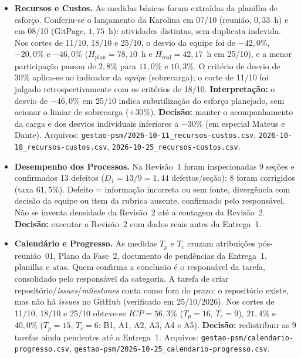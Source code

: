 \begin{itemize}
    \item \textbf{Recursos e Custos.}
    As medidas básicas foram extraídas da planilha de esforço. Conferiu-se o lançamento da Karolina em 07/10 (reunião, $0{,}33$~h) e em 08/10 (GitPage, $1{,}75$~h): atividades distintas, sem duplicata indevida. Nos cortes de 11/10, 18/10 e 25/10, o desvio da equipe foi de $-42{,}0\%$, $-20{,}0\%$ e $-46{,}0\%$ ($H_{\mathrm{plan}}=78{,}10$~h e $H_{\mathrm{real}}=42{,}17$~h em 25/10), e a menor participação passou de $2{,}8\%$ para $11{,}0\%$ e $10{,}3\%$. O critério de desvio de $30\%$ aplica-se ao indicador da \textit{equipe} (sobrecarga); o corte de 11/10 foi julgado retrospectivamente com os critérios de 18/10. \textbf{Interpretação:} o desvio de $-46{,}0\%$ em 25/10 indica subutilização do esforço planejado, sem acionar o limiar de sobrecarga ($+30\%$). \textbf{Decisão:} manter o acompanhamento da carga e dos desvios individuais inferiores a $-30\%$ (em especial Mateus e Dante). Arquivos: \texttt{gestao-psm/2026-10-11\_recursos-custos.csv}, \texttt{2026-10-18\_recursos-custos.csv}, \texttt{2026-10-25\_recursos-custos.csv}.

    \item \textbf{Desempenho dos Processos.}
    Na Revisão~1 foram inspecionadas 9 seções e confirmados 13 defeitos ($D_1=13/9=1{,}44$ defeitos/seção); 8 foram corrigidos (taxa $61{,}5\%$). Defeito = informação incorreta ou sem fonte, divergência com decisão da equipe ou item da rubrica ausente, confirmado pelo responsável. Não se inventa densidade da Revisão~2 até a contagem da Revisão~2. \textbf{Decisão:} executar a Revisão~2 com dados reais antes da Entrega~1.

    \item \textbf{Calendário e Progresso.}
    As medidas $T_p$ e $T_c$ cruzam atribuições pós-reunião~01, Plano da Fase~2, documento de pendências da Entrega~1, planilha e atas. Quem confirma a conclusão é o responsável da tarefa, consolidado pelo responsável da categoria. A tarefa de criar repositório/\textit{issues}/\textit{milestones} conta como fora do prazo: o repositório existe, mas não há \textit{issues} no GitHub (verificado em 25/10/2026). Nos cortes de 11/10, 18/10 e 25/10 obteve-se $ICP=56{,}3\%$ ($T_p=16$, $T_c=9$), $21{,}4\%$ e $40{,}0\%$ ($T_p=15$, $T_c=6$: B1, A1, A2, A3, A4 e A5). \textbf{Decisão:} redistribuir as 9 tarefas ainda pendentes até a Entrega~1. Arquivos: \texttt{gestao-psm/calendario-progresso.csv}, \texttt{gestao-psm/2026-10-25\_calendario-progresso.csv}.
\end{itemize}

